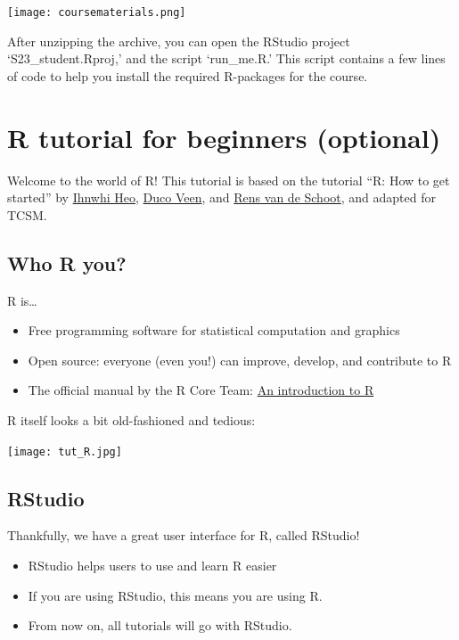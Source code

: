 \documentclass[
]{book}
\providecommand{\tightlist}{%
  \setlength{\itemsep}{0pt}\setlength{\parskip}{0pt}}
\begin{document}
\texttt{[image: coursematerials.png]}

After unzipping the archive, you can open the RStudio project `S23\_student.Rproj,' and the script `run\_me.R.' This script contains a few lines of code to help you install the required R-packages for the course.

\hypertarget{r-tutorial-for-beginners-optional}{%
\section{R tutorial for beginners (optional)}\label{r-tutorial-for-beginners-optional}}

Welcome to the world of R! This tutorial is based on the tutorial ``R: How to get started'' by \href{https://www.linkedin.com/in/ihnwhi-heo/}{Ihnwhi Heo}, \href{https://www.ducoveen.com/}{Duco Veen}, and \href{https://www.rensvandeschoot.com/}{Rens van de Schoot}, and adapted for TCSM.

\hypertarget{who-r-you}{%
\subsection{Who R you?}\label{who-r-you}}

R is\ldots{}

\begin{itemize}
\tightlist
\item
  Free programming software for statistical computation and graphics
\item
  Open source: everyone (even you!) can improve, develop, and contribute to R
\item
  The official manual by the R Core Team: \href{https://cran.r-project.org/doc/manuals/r-release/R-intro.pdf}{An introduction to R}
\end{itemize}

R itself looks a bit old-fashioned and tedious:

\texttt{[image: tut\_R.jpg]}

\hypertarget{rstudio}{%
\subsection{RStudio}\label{rstudio}}

Thankfully, we have a great user interface for R, called RStudio!

\begin{itemize}
\tightlist
\item
  RStudio helps users to use and learn R easier
\item
  If you are using RStudio, this means you are using R.
\item
  From now on, all tutorials will go with RStudio.
\end{itemize}
\end{document}
